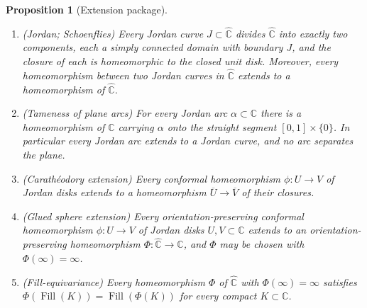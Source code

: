 \documentclass[11pt,reqno]{amsart}
\newtheorem{proposition}[theorem]{Proposition}
\theoremstyle{definition}
\theoremstyle{remark}
\newcommand{\C}{\mathbb C}
\newcommand{\Chat}{\widehat{\mathbb C}}
\newcommand{\Fill}{\operatorname{Fill}}
\begin{document}
\begin{proposition}[Extension package]\label{prop:A-extension}
\leavevmode
\begin{enumerate}
\item \textup{(Jordan; Schoenflies)}  Every Jordan curve
$J\subset\Chat$ divides $\Chat$ into exactly two components, each a
simply connected domain with boundary $J$, and the closure of each is
homeomorphic to the closed unit disk.  Moreover, every homeomorphism
between two Jordan curves in $\Chat$ extends to a homeomorphism of
$\Chat$.
\item \textup{(Tameness of plane arcs)}  For every Jordan arc
$\alpha\subset\C$ there is a homeomorphism of $\C$ carrying $\alpha$ onto
the straight segment $[0,1]\times\{0\}$.  In particular every Jordan arc
extends to a Jordan curve, and no arc separates the plane.
\item \textup{(Carath\'eodory extension)}  Every conformal homeomorphism
$\phi\colon U\to V$ of Jordan disks extends to a homeomorphism
$\overline{U}\to\overline{V}$ of their closures.
\item \textup{(Glued sphere extension)}  Every orientation-preserving
conformal homeomorphism $\phi\colon U\to V$ of Jordan disks
$U,V\subset\C$ extends to an orientation-preserving homeomorphism
$\Phi\colon\Chat\to\Chat$, and $\Phi$ may be chosen with
$\Phi(\infty)=\infty$.
\item \textup{(Fill-equivariance)}  Every homeomorphism $\Phi$ of
$\Chat$ with $\Phi(\infty)=\infty$ satisfies
$\Phi(\Fill(K))=\Fill(\Phi(K))$ for every compact $K\subset\C$.
\end{enumerate}
\end{proposition}
\end{document}
